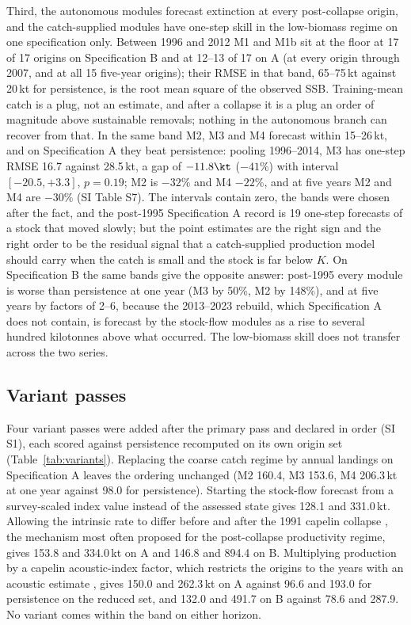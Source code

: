 Third, the autonomous modules forecast extinction at every post-collapse origin, and the catch-supplied modules have one-step skill in the low-biomass regime on one specification only. Between 1996 and 2012 M1 and M1b sit at the floor at 17 of 17 origins on Specification B and at 12--13 of 17 on A (at every origin through 2007, and at all 15 five-year origins); their RMSE in that band, 65--75\,kt against 20\,kt for persistence, is the root mean square of the observed SSB. Training-mean catch is a plug, not an estimate, and after a collapse it is a plug an order of magnitude above sustainable removals; nothing in the autonomous branch can recover from that. In the same band M2, M3 and M4 forecast within 15--26\,kt, and on Specification A they beat persistence: pooling 1996--2014, M3 has one-step RMSE 16.7 against 28.5\,kt, a gap of $-11.8\kt$ ($-41\%$) with interval $[-20.5, +3.3]$, $p = 0.19$; M2 is $-32\%$ and M4 $-22\%$, and at five years M2 and M4 are $-30\%$ (SI Table S7). The intervals contain zero, the bands were chosen after the fact, and the post-1995 Specification A record is 19 one-step forecasts of a stock that moved slowly; but the point estimates are the right sign and the right order to be the residual signal that a catch-supplied production model should carry when the catch is small and the stock is far below $K$. On Specification B the same bands give the opposite answer: post-1995 every module is worse than persistence at one year (M3 by 50\%, M2 by 148\%), and at five years by factors of 2--6, because the 2013--2023 rebuild, which Specification A does not contain, is forecast by the stock-flow modules as a rise to several hundred kilotonnes above what occurred. The low-biomass skill does not transfer across the two series.

\FloatBarrier
\subsection{Variant passes}\label{sec:variants}

Four variant passes were added after the primary pass and declared in order (SI S1), each scored against persistence recomputed on its own origin set (Table~\ref{tab:variants}). Replacing the coarse catch regime by annual landings on Specification A leaves the ordering unchanged (M2 160.4, M3 153.6, M4 206.3\,kt at one year against 98.0 for persistence). Starting the stock-flow forecast from a survey-scaled index value instead of the assessed state gives 128.1 and 331.0\,kt. Allowing the intrinsic rate to differ before and after the 1991 capelin collapse \citep{Buren2014,DFO2024b}, the mechanism most often proposed for the post-collapse productivity regime, gives 153.8 and 334.0\,kt on A and 146.8 and 894.4 on B. Multiplying production by a capelin acoustic-index factor, which restricts the origins to the years with an acoustic estimate \citep{Murphy2025,NAFC2025}, gives 150.0 and 262.3\,kt on A against 96.6 and 193.0 for persistence on the reduced set, and 132.0 and 491.7 on B against 78.6 and 287.9. No variant comes within the band on either horizon.

